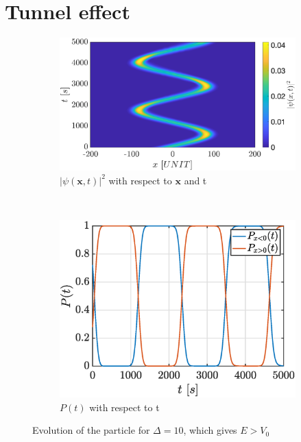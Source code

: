 \documentclass[a4paper,12pt,twoside]{article}
\newcommand{\mbf}[1]{\mathbf{#1}} %
\begin{document}
\section{Tunnel effect}

\begin{figure}[h]
  \centering
  \begin{subfigure}[t]{0.45\textwidth}
    \includegraphics[width=\textwidth]{graphs/iii_evo_E>v0_psi.eps}
    \caption{$|\psi(\mbf{x}, t)|^2$ with respect to $\mbf{x}$ and t}
    \label{fig:iii_evo_E>v0_psi}
  \end{subfigure}
  ~
  \begin{subfigure}[t]{0.45\textwidth}
    \includegraphics[width=\textwidth]{graphs/iii_evo_E>v0_prob.eps}
    \caption{$P(t)$ with respect to t}
    \label{fig:iii_evo_E>v0_prob}
  \end{subfigure}
  \caption{Evolution of the particle for $\Delta = 10$, which gives $E > V_0$}
  \label{fig:iii_evo_E>v0}
\end{figure}
\end{document}
